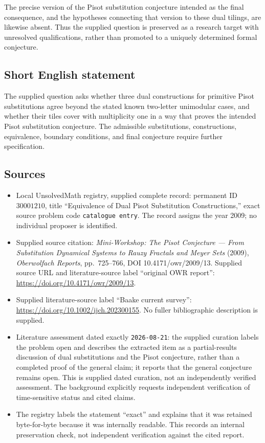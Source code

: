 \documentclass[11pt]{article}
\begin{document}
The precise version of the Pisot substitution conjecture intended as the final consequence, and the hypotheses connecting that version to these dual tilings, are likewise absent. Thus the supplied question is preserved as a research target with unresolved qualifications, rather than promoted to a uniquely determined formal conjecture.
\subsection{Short English statement}
The supplied question asks whether three dual constructions for primitive Pisot substitutions agree beyond the stated known two-letter unimodular cases, and whether their tiles cover with multiplicity one in a way that proves the intended Pisot substitution conjecture. The admissible substitutions, constructions, equivalence, boundary conditions, and final conjecture require further specification.
\subsection{Sources}
\begin{itemize}
\item Local UnsolvedMath registry, supplied complete record: permanent ID \(30001210\), title ``Equivalence of Dual Pisot Substitution Constructions,'' exact source problem code \texttt{catalogue entry}. The record assigns the year 2009; no individual proposer is identified.
\item Supplied source citation: \emph{Mini-Workshop: The Pisot Conjecture --- From Substitution Dynamical Systems to Rauzy Fractals and Meyer Sets} (2009), \emph{Oberwolfach Reports}, pp.~725--766, DOI 10.4171/owr/2009/13. Supplied source URL and literature-source label ``original OWR report'': \url{https://doi.org/10.4171/owr/2009/13}.
\item Supplied literature-source label ``Baake current survey'': \url{https://doi.org/10.1002/ijch.202300155}. No fuller bibliographic description is supplied.
\item Literature assessment dated exactly \texttt{2026-08-21}: the supplied curation labels the problem open and describes the extracted item as a partial-results discussion of dual substitutions and the Pisot conjecture, rather than a completed proof of the general claim; it reports that the general conjecture remains open. This is supplied dated curation, not an independently verified assessment. The background explicitly requests independent verification of time-sensitive status and cited claims.
\item The registry labels the statement ``exact'' and explains that it was retained byte-for-byte because it was internally readable. This records an internal preservation check, not independent verification against the cited report.
\end{itemize}
\end{document}
